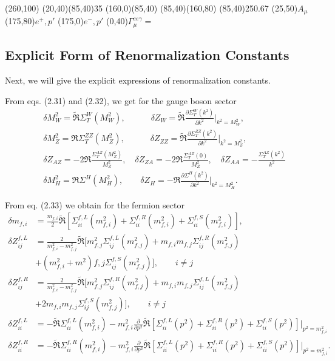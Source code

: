 \begin{axopicture}(260,100)
	\Photon(20,40)(85,40){3}{5}
	\Line[arrow](160,0)(85,40)
	\Line[arrow](85,40)(160,80)
	\GCirc(85,40){25}{0.67}
	\Text(25,50){$A_\mu$}
	\Text(175,80){$e^+,p'$}
	\Text(175,0){$e^-,p'$}
	\Text(0,40){$\Gamma^{ee\gamma}_\mu=$}
\end{axopicture}



\subsection{Explicit Form of Renormalization Constants}
Next, we will give the explicit expressions of renormalization constants.

From eqs. (2.31) and (2.32), we get for the gauge boson sector
\begin{eqnarray}
&&\delta M^2_W=\widetilde{\Re}\Sigma^W_T(M^2_W),\quad\qquad \delta Z_W=\widetilde{\Re}\frac{\partial \Sigma^W_T(k^2)}{\partial k^2}|_{k^2=M^2_W},\nonumber\\
&&\delta M^2_Z=\Re\Sigma^{ZZ}_T(M^2_Z),\quad\qquad \delta Z_{ZZ}=\widetilde{\Re}\frac{\partial \Sigma^{ZZ}_T(k^2)}{\partial k^2}|_{k^2=M^2_Z},\nonumber\\
&&\delta Z_{AZ}=-2\Re\frac{\Sigma_T^{AZ}(M_Z^2)}{M_Z^2},\quad
\delta Z_{ZA}=-2\Re\frac{\Sigma_T^{AZ}(0)}{M_Z^2},
\quad \delta Z_{AA}=-\frac{\Sigma_T^{AZ}(k^2)}{k^2}\nonumber\\
&&\delta M^2_H=\Re\Sigma^H(M^2_H), \quad\quad \delta Z_H=-\Re\frac{\partial \Sigma^H(k^2)}{\partial k^2}|_{k^2=M_H^2}.
\end{eqnarray}

From eq. (2.33) we obtain for the fermion sector
\begin{align}
\delta m_{f,i}&=\frac{m_{f,i}}{2}\widetilde{\Re}[\Sigma^{f,L}_{ii}(m_{f,i}^2)+\Sigma^{f,R}_{ii}(m_{f,i}^2)+\Sigma^{f,S}_{ii}(m_{f,i}^2)],\nonumber\\
\delta Z_{ij}^{f,L}&=\frac{2}{m^2_{f,i}-m^2_{f,j}}\widetilde{\Re}[m^2_{f,j}\Sigma^{f,L}_{ij}(m_{f,j}^2)+m_{f,i}m_{f,j}\Sigma^{f,R}_{ij}(m_{f,j}^2)\nonumber\\
&+(m^2_{f,i}+m^2){f,j}\Sigma^{f,S}_{ij}(m_{f,j}^2)], \qquad i\neq j\nonumber\\
\delta Z_{ij}^{f,R}&=\frac{2}{m^2_{f,i}-m^2_{f,j}}\widetilde{\Re}[m^2_{f,j}\Sigma^{f,R}_{ij}(m_{f,j}^2)+m_{f,i}m_{f,j}\Sigma^{f,L}_{ij}(m_{f,j}^2)\nonumber\\
&+2m_{f,i}m_{f,j}\Sigma^{f,S}_{ij}(m_{f,j}^2)], \qquad i\neq j\nonumber\\
\delta Z^{f,L}_{ii}&=-\widetilde{\Re}\Sigma^{f,L}_{ii}(m^2_{f,i})-m^2_{f,i}\frac{\partial}{\partial p^2}\widetilde{\Re}[\Sigma^{f,L}_{ii}(p^2)+\Sigma^{f,R}_{ii}(p^2)+\Sigma^{f,S}_{ii}(p^2)]|_{p^2=m^2_{f,i}}\nonumber\\
\delta Z^{f,R}_{ii}&=-\widetilde{\Re}\Sigma^{f,R}_{ii}(m^2_{f,i})-m^2_{f,i}\frac{\partial}{\partial p^2}\widetilde{\Re}[\Sigma^{f,L}_{ii}(p^2)+\Sigma^{f,R}_{ii}(p^2)+\Sigma^{f,S}_{ii}(p^2)]|_{p^2=m^2_{f,i}}.
\end{align}

